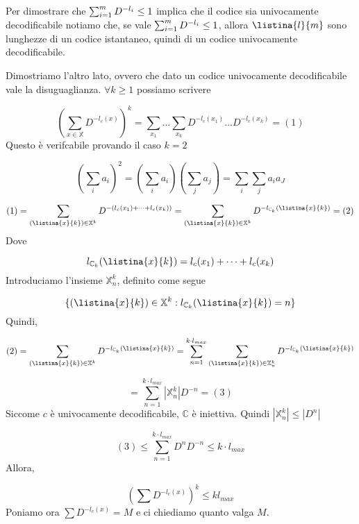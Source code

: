 \documentclass[12pt]{report}
\begin{document}
    \begin{dimo}
        Per dimostrare che $\sum_{i=1}^{m} D^{-l_i} \leq 1$ implica che il codice sia univocamente decodificabile notiamo che, se vale $\sum_{i=1}^{m} D^{-l_i} \leq 1$, allora $\listina{l}{m}$ sono lunghezze di un codice istantaneo, quindi di un codice univocamente decodificabile.

        \vspace{5px}

        \noindent
        Dimostriamo l'altro lato, ovvero che dato un codice univocamente decodificabile vale la disuguaglianza.
        $\forall k \geq 1$ possiamo scrivere

        $$(\sum_{x \in \mathbb{X}} D^{-l_c(x)})^k = \sum_{x_1} \dots \sum_{x_k} D^{-l_c(x_1)} \dots D^{-l_c(x_k)} = (1)$$
        Questo è verifcabile provando il caso $k=2$

        $$(\sum_i a_i)^2 = (\sum_i a_i) (\sum_j a_j) = \sum_i \sum_j a_i a_J $$

        $$(1) = \sum_{(\listina{x}{k}) \in \mathbb{X}^k} D^{-(l_c(x_1) + \dots + l_c(x_k))} =  \sum_{(\listina{x}{k}) \in \mathbb{X}^k} D^{-l_{\mathbb{C}_k} (\listina{x}{k})} = (2)$$
        Dove

        $$l_{\mathbb{C}_k} (\listina{x}{k}) = l_c(x_1) + \dots + l_c(x_k)$$
        Introduciamo l'insieme $\mathbb{X}_n^k$, definito come segue

        $$\{(\listina{x}{k}) \in \mathbb{X}^k : l_{\mathbb{C}_k} (\listina{x}{k}) = n \}$$
        Quindi,

        $$(2) = \sum_{(\listina{x}{k}) \in \mathbb{X}^k} D^{-l_{\mathbb{C}_k} (\listina{x}{k})} = \sum_{n = 1}^{k \cdot l_{max}} \sum_{(\listina{x}{k}) \in \mathbb{X}_n^k} D^{-l_{\mathbb{C}_k} (\listina{x}{k})}$$

        $$= \sum_{n = 1}^{k \cdot l_{max}}  |\mathbb{X}_n^k|D^{-n} = (3)$$
        Siccome $c$ è univocamente decodificabile, $\mathbb{C}$ è iniettiva. Quindi $|\mathbb{X}_n^k| \leq |D^n|$

        $$ (3) \leq \sum_{n = 1}^{k \cdot l_{max}} D^n D^{-n}  \leq k \cdot l_{max}$$
        Allora,

        $$(\sum D^{-l_c(x)})^k \leq k l_{max}$$
        Poniamo ora $\sum D^{-l_c(x)} = M$ e ci chiediamo quanto valga $M$.

\end{dimo}
\end{document}
